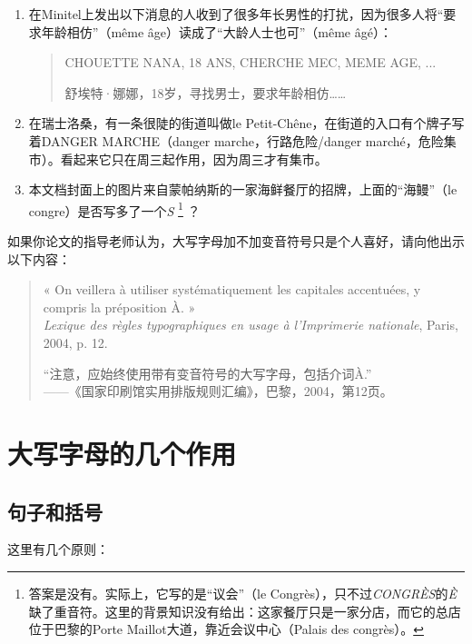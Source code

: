 \begin{enumerate}
    \item 在Minitel上发出以下消息的人收到了很多年长男性的打扰，因为很多人将``要求年龄相仿''（même âge）读成了``大龄人士也可''（même âgé）：
    \begin{quote}
        CHOUETTE NANA, 18 ANS, CHERCHE MEC, MEME AGE, ... 
        \begin{bil}
            舒埃特·娜娜，18岁，寻找男士，要求年龄相仿……
        \end{bil}
    \end{quote}
    \item 在瑞士洛桑，有一条很陡的街道叫做le Petit-Chêne，在街道的入口有个牌子写着DANGER MARCHE（danger marche，行路危险/danger marché，危险集市）。看起来它只在周三起作用，因为周三才有集市。
    \item 本文档封面上的图片来自蒙帕纳斯的一家海鲜餐厅的招牌，上面的``海鳗''（le congre）是否写多了一个\emph{S}%
        \footnote{答案是没有。实际上，它写的是``议会''（le Congrès），只不过\emph{CONGRÈS}的\emph{È}缺了重音符。这里的背景知识没有给出：这家餐厅只是一家分店，而它的总店位于巴黎的Porte Maillot大道，靠近会议中心（Palais des congrès）。}
    ？
\end{enumerate}

如果你论文的指导老师认为，大写字母加不加变音符号只是个人喜好，请向他出示以下内容：

\begin{quote}
    « On veillera à utiliser systématiquement les capitales accentuées, y compris la préposition À. »\\
    \emph{Lexique des règles typographiques en usage à l'Imprimerie nationale}, Paris, 2004, p. 12.
    \begin{bil}
        ``注意，应始终使用带有变音符号的大写字母，包括介词À.''\\
        ——《国家印刷馆实用排版规则汇编》，巴黎，2004，第12页。
    \end{bil}
\end{quote}

\section{大写字母的几个作用}

\subsection{句子和括号}

这里有几个原则：

